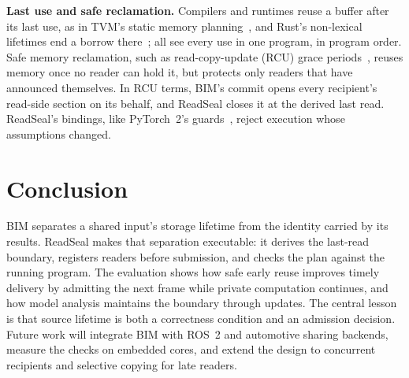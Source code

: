 \documentclass[conference]{IEEEtran}
\newif\ifaidisclosure
\begin{document}
\textbf{Last use and safe reclamation.} Compilers and runtimes reuse a buffer after its last use, as in TVM's static memory planning~\cite{tvm}, and Rust's non-lexical lifetimes end a borrow there~\cite{nll}; all see every use in one program, in program order. Safe memory reclamation, such as read-copy-update (RCU) grace periods~\cite{rcu}, reuses memory once no reader can hold it, but protects only readers that have announced themselves. In RCU terms, BIM's commit opens every recipient's read-side section on its behalf, and ReadSeal closes it at the derived last read. ReadSeal's bindings, like PyTorch~2's guards~\cite{pytorch2}, reject execution whose assumptions changed.

\section{Conclusion}

BIM separates a shared input's storage lifetime from the identity carried by its results. ReadSeal makes that separation executable: it derives the last-read boundary, registers readers before submission, and checks the plan against the running program. The evaluation shows how safe early reuse improves timely delivery by admitting the next frame while private computation continues, and how model analysis maintains the boundary through updates. The central lesson is that source lifetime is both a correctness condition and an admission decision. Future work will integrate BIM with ROS~2 and automotive sharing backends, measure the checks on embedded cores, and extend the design to concurrent recipients and selective copying for late readers.

\ifaidisclosure
\section*{Acknowledgment}
OpenAI Codex assisted with language editing, readability revisions, figure regeneration from existing source files, and build verification for this revision. The experimental data and figure values are unchanged.
\fi



\end{document}
